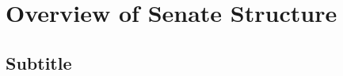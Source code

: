 \documentclass[11pt,a4paper]{article}
\begin{document}

\section{Overview of Senate Structure}

\lipsum[1-3]


\subsection*{Subtitle}
\lipsum[4-5]
\end{document}
